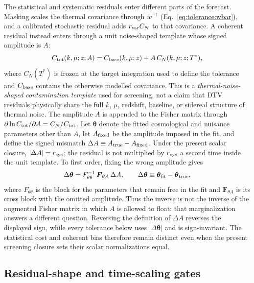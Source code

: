 The statistical and systematic residuals enter different parts of the forecast.  Masking scales the thermal covariance through $\bar w^{-1}$ (Eq.~\eqref{eq:tolerance:wbar}), and a calibrated stochastic residual adds $r_{\rm var}C_N$ to that covariance.  A coherent residual instead enters through a unit noise-shaped template whose signed amplitude is $A$:
\begin{equation}
  C_{\rm tot}(k,\mu;z;A)
  = C_{\rm base}(k,\mu;z) + A\,C_N(k,\mu;z;T^\ast),
  \label{eq:tolerance:template}
\end{equation}
where $C_N(T^\ast)$ is frozen at the target integration used to define the tolerance and $C_{\rm base}$ contains the otherwise modelled covariance.  This is a \emph{thermal-noise-shaped contamination template} used for screening, not a claim that DTV residuals physically share the full $k$, $\mu$, redshift, baseline, or sidereal structure of thermal noise.  The amplitude $A$ is appended to the Fisher matrix through $\partial\ln C_{\rm tot}/\partial A=C_N/C_{\rm tot}$.  Let $\boldsymbol\theta$ denote the fitted cosmological and nuisance parameters other than $A$, let $A_{\rm fixed}$ be the amplitude imposed in the fit, and define the signed mismatch $\Delta A\equiv A_{\rm true}-A_{\rm fixed}$.  Under the present scalar closure, $|\Delta A|=r_{\rm sys}$; the residual is not multiplied by $r_{\rm sys}$ a second time inside the unit template.  To first order, fixing the wrong amplitude gives
\begin{equation}
\label{eq:tolerance:bias}
\Delta\boldsymbol\theta
 = F_{\theta\theta}^{-1}\,\boldsymbol F_{\theta A}\,\Delta A,
\qquad
\Delta\boldsymbol\theta\equiv
\boldsymbol\theta_{\rm fit}-\boldsymbol\theta_{\rm true},
\end{equation}
where $F_{\theta\theta}$ is the block for the parameters that remain free in the fit and $\boldsymbol F_{\theta A}$ is its cross block with the omitted amplitude.  Thus the inverse is not the inverse of the augmented Fisher matrix in which $A$ is allowed to float: that marginalization answers a different question.  Reversing the definition of $\Delta A$ reverses the displayed sign, while every tolerance below uses $|\Delta\boldsymbol\theta|$ and is sign-invariant.  The statistical cost and coherent bias therefore remain distinct even when the present screening closure sets their scalar normalizations equal.

\subsection*{Residual-shape and time-scaling gates}

